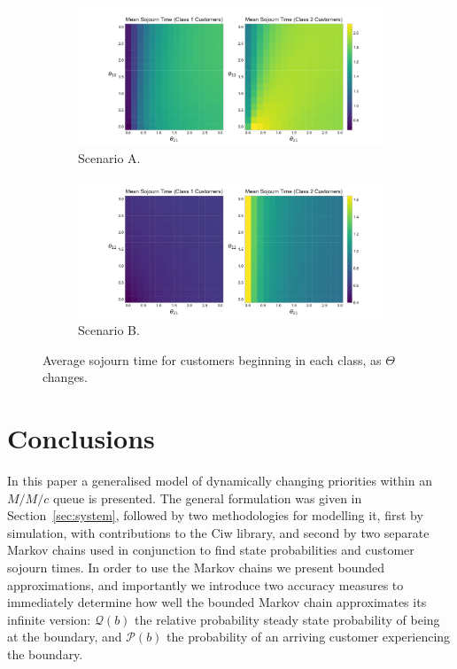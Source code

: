 \documentclass{article}
\begin{document}
\begin{figure}
  \begin{center}
  \begin{subfigure}[b]{0.49\textwidth}
    \includegraphics[width=\textwidth]{img/vary_thetas_sojourn_scen1.pdf}
    \caption{Scenario A.}
    \label{fig:sojourn_A}
  \end{subfigure}
  \begin{subfigure}[b]{0.49\textwidth}
    \includegraphics[width=\textwidth]{img/vary_thetas_sojourn_scen2.pdf}
    \caption{Scenario B.}
    \label{fig:sojourn_B}
  \end{subfigure}
  \caption{Average sojourn time for customers beginning in each class, as
  $\Theta$ changes.}
  \end{center}
\end{figure}


\section{Conclusions}
In this paper a generalised model of dynamically changing priorities within an
$M/M/c$ queue is presented. The general formulation was given in
Section~\ref{sec:system}, followed by two methodologies for modelling it,
first by simulation, with contributions to the Ciw library, and second by two
separate Markov chains used in conjunction to find state probabilities and
customer sojourn times. In order to use the Markov chains we present bounded
approximations, and importantly we introduce two accuracy measures to
immediately determine how well the bounded Markov chain approximates its
infinite version: $\mathcal{Q}(b)$ the relative probability steady state
probability of being at the boundary, and $\mathcal{P}(b)$ the probability of an
arriving customer experiencing the boundary.
\end{document}

